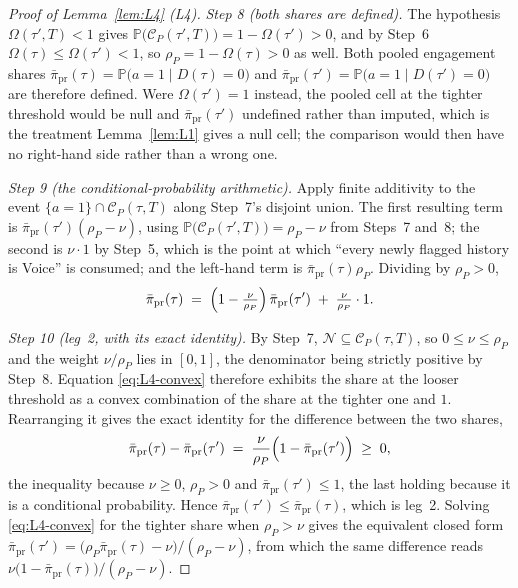 \documentclass[11pt]{article}
\newcommand{\Prb}{\mathbb{P}}
\begin{document}
\begin{proof}[Proof of Lemma~\ref{lem:L4} (L4)]
\emph{Step 8 (both shares are defined).} The hypothesis $\Omega(\tau',T) < 1$ gives
$\Prb\bigl(\mathcal C_P(\tau',T)\bigr) = 1-\Omega(\tau') > 0$, and by Step~6
$\Omega(\tau) \le \Omega(\tau') < 1$, so $\rho_P = 1-\Omega(\tau) > 0$ as well. Both pooled
engagement shares $\bar\pi_{\mathrm{pr}}(\tau) = \Prb\bigl(a=1 \mid D(\tau)=0\bigr)$ and
$\bar\pi_{\mathrm{pr}}(\tau') = \Prb\bigl(a=1 \mid D(\tau')=0\bigr)$ are therefore defined. Were
$\Omega(\tau') = 1$ instead, the pooled cell at the tighter threshold would be null and
$\bar\pi_{\mathrm{pr}}(\tau')$ undefined rather than imputed, which is the treatment
Lemma~\ref{lem:L1} gives a null cell; the comparison would then have no right-hand side rather than a
wrong one.

\emph{Step 9 (the conditional-probability arithmetic).} Apply finite additivity to the event
$\{a=1\}\cap\mathcal C_P(\tau,T)$ along Step~7's disjoint union. The first resulting term is
$\bar\pi_{\mathrm{pr}}(\tau')(\rho_P-\nu)$, using
$\Prb\bigl(\mathcal C_P(\tau',T)\bigr) = \rho_P-\nu$ from Steps~7 and~8; the second is $\nu\cdot 1$
by Step~5, which is the point at which ``every newly flagged history is Voice'' is consumed; and the
left-hand term is $\bar\pi_{\mathrm{pr}}(\tau)\rho_P$. Dividing by $\rho_P > 0$,
\begin{equation}
\label{eq:L4-convex}
\bar\pi_{\mathrm{pr}}(\tau) \;=\; \Bigl(1-\tfrac{\nu}{\rho_P}\Bigr)\,\bar\pi_{\mathrm{pr}}(\tau')
 \;+\; \tfrac{\nu}{\rho_P}\cdot 1 .
\end{equation}

\emph{Step 10 (leg~2, with its exact identity).} By Step~7, $\mathcal N \subseteq \mathcal
C_P(\tau,T)$, so $0 \le \nu \le \rho_P$ and the weight $\nu/\rho_P$ lies in $[0,1]$, the denominator
being strictly positive by Step~8. Equation \eqref{eq:L4-convex} therefore exhibits the share at the
looser threshold as a convex combination of the share at the tighter one and $1$. Rearranging it
gives the exact identity for the difference between the two shares,
\begin{equation}
\label{eq:L4-share}
\bar\pi_{\mathrm{pr}}(\tau) - \bar\pi_{\mathrm{pr}}(\tau')
 \;=\; \frac{\nu}{\rho_P}\Bigl(1-\bar\pi_{\mathrm{pr}}(\tau')\Bigr) \;\ge\; 0,
\end{equation}
the inequality because $\nu \ge 0$, $\rho_P > 0$ and $\bar\pi_{\mathrm{pr}}(\tau') \le 1$, the last
holding because it is a conditional probability. Hence
$\bar\pi_{\mathrm{pr}}(\tau') \le \bar\pi_{\mathrm{pr}}(\tau)$, which is leg~2. Solving
\eqref{eq:L4-convex} for the tighter share when $\rho_P > \nu$ gives the equivalent closed form
$\bar\pi_{\mathrm{pr}}(\tau') = \bigl(\rho_P\bar\pi_{\mathrm{pr}}(\tau)-\nu\bigr)/(\rho_P-\nu)$,
from which the same difference reads $\nu\bigl(1-\bar\pi_{\mathrm{pr}}(\tau)\bigr)/(\rho_P-\nu)$.


\end{proof}
\end{document}

